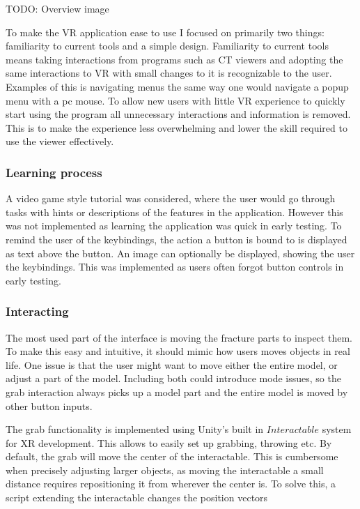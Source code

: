 \documentclass[a4paper]{report}
\begin{document}
TODO: Overview image

To make the VR application ease to use I focused on primarily two things: familiarity to current tools and a simple design.
Familiarity to current tools means taking interactions from programs such as CT viewers and adopting the same interactions to VR with small changes to it is recognizable to the user. Examples of this is navigating menus the same way one would navigate a popup menu with a pc mouse. 
To allow new users with little VR experience to quickly start using the program all unnecessary interactions and information is removed. This is to make the experience less overwhelming and lower the skill required to use the viewer effectively.

\subsubsection{Learning process}
A video game style tutorial was considered, where the user would go through tasks with hints or descriptions of the features in the application. However this was not implemented as learning the application was quick in early testing.
To remind the user of the keybindings, the action a button is bound to  is displayed as text above the button. An image can optionally be displayed, showing the user the keybindings. This was implemented as users often forgot button controls in early testing.

\subsubsection{Interacting}

The most used part of the interface is moving the fracture parts to inspect them. To make this easy and intuitive, it should mimic how users moves objects in real life.
One issue is that the user might want to move either the entire model, or adjust a part of the model. Including both could introduce mode issues\cite{nngroup}, so the grab interaction always picks up a model part and the entire model is moved by other button inputs.

The grab functionality is implemented using Unity's built in $Interactable$ system for XR\cite{noauthor_xr_nodate} development. This allows to easily set up grabbing, throwing etc. By default, the grab will move the center of the interactable. This is cumbersome when precisely adjusting larger objects, as moving the interactable a small distance requires repositioning it from wherever the center is. To solve this, a script extending the interactable changes the position vectors 
\end{document}
